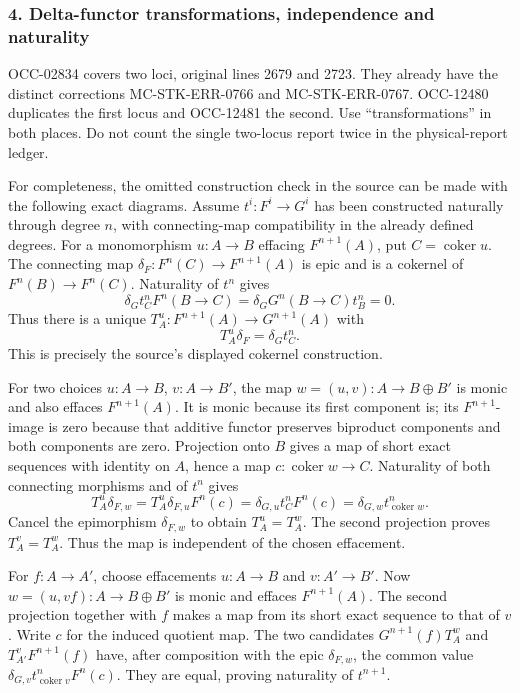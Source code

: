 \subsubsection{4. Delta-functor transformations, independence and naturality}\label{delta-functor-transformations-independence-and-naturality}

OCC-02834 covers two loci, original lines 2679 and 2723. They already have the distinct corrections MC-STK-ERR-0766 and MC-STK-ERR-0767. OCC-12480 duplicates the first locus and OCC-12481 the second. Use ``transformations'' in both places. Do not count the single two-locus report twice in the physical-report ledger.

For completeness, the omitted construction check in the source can be made with the following exact diagrams. Assume \(t^i:F^i\to G^i\) has been constructed naturally through degree \(n\), with connecting-map compatibility in the already defined degrees. For a monomorphism \(u:A\to B\) effacing \(F^{n+1}(A)\), put \(C=\operatorname{coker}u\). The connecting map \(\delta_F:F^n(C)\to F^{n+1}(A)\) is epic and is a cokernel of \(F^n(B)\to F^n(C)\). Naturality of \(t^n\) gives \[
\delta_Gt_C^nF^n(B\to C)
=\delta_GG^n(B\to C)t_B^n=0.
\] Thus there is a unique \(T_A^u:F^{n+1}(A)\to G^{n+1}(A)\) with \[
T_A^u\delta_F=\delta_Gt_C^n.
\] This is precisely the source's displayed cokernel construction.

For two choices \(u:A\to B\), \(v:A\to B'\), the map \(w=(u,v):A\to B\oplus B'\) is monic and also effaces \(F^{n+1}(A)\). It is monic because its first component is; its \(F^{n+1}\)-image is zero because that additive functor preserves biproduct components and both components are zero. Projection onto \(B\) gives a map of short exact sequences with identity on \(A\), hence a map \(c:\operatorname{coker}w\to C\). Naturality of both connecting morphisms and of \(t^n\) gives \[
T_A^u\delta_{F,w}
=T_A^u\delta_{F,u}F^n(c)
=\delta_{G,u}t_C^nF^n(c)
=\delta_{G,w}t_{\operatorname{coker}w}^n.
\] Cancel the epimorphism \(\delta_{F,w}\) to obtain \(T_A^u=T_A^w\). The second projection proves \(T_A^v=T_A^w\). Thus the map is independent of the chosen effacement.

For \(f:A\to A'\), choose effacements \(u:A\to B\) and \(v:A'\to B'\). Now \(w=(u,vf):A\to B\oplus B'\) is monic and effaces \(F^{n+1}(A)\). The second projection together with \(f\) makes a map from its short exact sequence to that of \(v\). Write \(c\) for the induced quotient map. The two candidates \(G^{n+1}(f)T_A^w\) and \(T_{A'}^vF^{n+1}(f)\) have, after composition with the epic \(\delta_{F,w}\), the common value \(\delta_{G,v}t_{\operatorname{coker}v}^nF^n(c)\). They are equal, proving naturality of \(t^{n+1}\).

